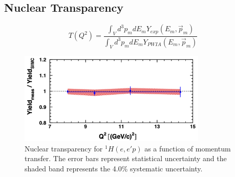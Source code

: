 \subsection{Nuclear Transparency}

\begin{equation}
    T(Q^2) = \frac{\int_{V} d^{3} p_{m} d E_{m} Y_{exp }(E_{m}, \vec{p}_{m})}
                  {\int_{V} d^{3} p_{m} d E_{m} Y_{PWIA}(E_{m}, \vec{p}_{m})}
\end{equation}


\begin{figure}[!h]
    \centering
    \includegraphics[width=0.8\textwidth]{chap5/lh2_results.png}
    \caption{
            Nuclear transparency for ${}^{1}H(e,e'p)$ as a function of
            momentum transfer.
            The error bars represent statistical uncertainty and the
            shaded band represents the 4.0\% systematic uncertainty.
            }
    \label{fig:lh2_transparency_results}
\end{figure}



